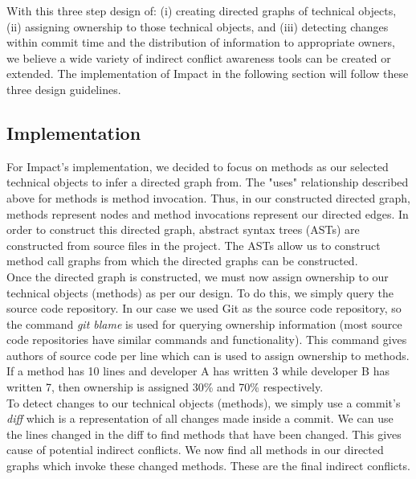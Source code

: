 \documentclass[conference]{IEEEtran}
\begin{document}
With this three step design of: (i) creating directed graphs of technical
objects, (ii) assigning ownership to those technical objects, and (iii)
detecting changes within commit time and the distribution of information
to appropriate owners, we believe a wide variety of
indirect conflict awareness tools can be created or extended. The
implementation of Impact in the following section will follow these
three design guidelines.

\subsection{Implementation}
For Impact's implementation, we decided to focus on methods as our
selected technical objects to infer a directed graph from. The "uses" 
relationship described above for methods is method invocation.
Thus, in our constructed directed graph, methods represent nodes
and method invocations represent our directed edges. In order to 
construct this directed graph, abstract syntax trees (ASTs) are 
constructed from source files in the project. The ASTs allow us
to construct method call graphs from which the directed 
graphs can be constructed.\\

Once the directed graph is constructed, we must now assign
ownership to our technical objects (methods) as per our design.
To do this, we simply query the source code repository. In our case
we used Git as the source code repository, so the command \textit{git blame}
is used for querying ownership information (most source code 
repositories have similar commands and functionality). This command 
gives authors of source code per line which can is used to assign
ownership to methods. If a method has 10 lines and developer A
has written 3 while developer B has written 7, then ownership is
assigned 30\% and 70\% respectively.\\

To detect changes to our technical objects (methods), we simply 
use a commit's \textit{diff} which is a representation of all changes
made inside a commit. We can use the lines changed in the diff to 
find methods that have been changed. This gives cause of potential
indirect conflicts. We now find all methods in our directed graphs
which invoke these changed methods. These are the final indirect
conflicts.\\
\end{document}
